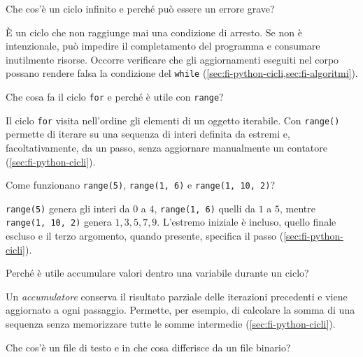 \begin{exercise}
\label{ex:fi-python-ciclo-infinito}
Che cos'è un ciclo infinito e perché può essere un errore grave?
\end{exercise}

È un ciclo che non raggiunge mai una condizione di arresto.
Se non è intenzionale, può impedire il completamento del programma
e consumare inutilmente risorse. Occorre verificare che gli
aggiornamenti eseguiti nel corpo possano rendere falsa la condizione
del \texttt{while} (\cref{sec:fi-python-cicli,sec:fi-algoritmi}).

\begin{exercise}
\label{ex:fi-python-for-range}
Che cosa fa il ciclo \texttt{for} e perché è utile con
\texttt{range}?
\end{exercise}

Il ciclo \texttt{for} visita nell'ordine gli elementi di un oggetto
iterabile. Con \texttt{range()} permette di iterare su una sequenza
di interi definita da estremi e, facoltativamente, da un passo,
senza aggiornare manualmente un contatore
(\cref{sec:fi-python-cicli}).

\clearpage

\begin{exercise}
\label{ex:fi-python-range-esempi}
Come funzionano \texttt{range(5)}, \texttt{range(1, 6)} e
\texttt{range(1, 10, 2)}?
\end{exercise}

\texttt{range(5)} genera gli interi da \(0\) a \(4\),
\texttt{range(1, 6)} quelli da \(1\) a \(5\), mentre
\texttt{range(1, 10, 2)} genera \(1,3,5,7,9\).
L'estremo iniziale è incluso, quello finale escluso e il terzo
argomento, quando presente, specifica il passo
(\cref{sec:fi-python-cicli}).

\begin{exercise}
\label{ex:fi-python-accumulatore}
Perché è utile accumulare valori dentro una variabile durante un
ciclo?
\end{exercise}

Un \emph{accumulatore} conserva il risultato parziale delle iterazioni
precedenti e viene aggiornato a ogni passaggio. Permette, per
esempio, di calcolare la somma di una sequenza senza memorizzare
tutte le somme intermedie (\cref{sec:fi-python-cicli}).

\begin{exercise}
\label{ex:fi-python-testo-binario}
Che cos'è un file di testo e in che cosa differisce da un file
binario?
\end{exercise}

